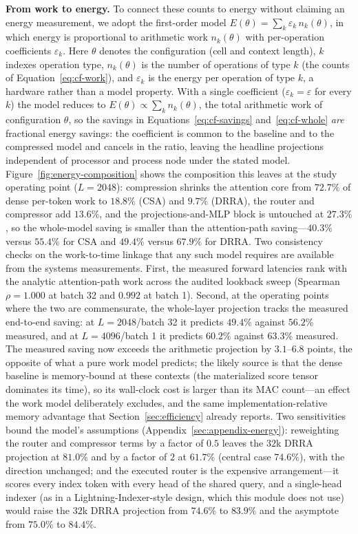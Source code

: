 \textbf{From work to energy.} To connect these counts to energy without
claiming an energy measurement, we adopt the first-order model
$E(\theta) = \sum_k \varepsilon_k \, n_k(\theta)$, in which energy is
proportional to arithmetic work $n_k(\theta)$ with per-operation
coefficients $\varepsilon_k$. Here $\theta$ denotes the configuration
(cell and context length), $k$ indexes operation type, $n_k(\theta)$ is
the number of operations of type $k$ (the counts of
Equation~\ref{eq:cf-work}), and $\varepsilon_k$ is the energy per
operation of type $k$, a hardware rather than a model property. With a
single coefficient ($\varepsilon_k = \varepsilon$ for every $k$) the model
reduces to $E(\theta) \propto \sum_k n_k(\theta)$, the total arithmetic work
of configuration $\theta$, so the savings in
Equations~\ref{eq:cf-savings} and~\ref{eq:cf-whole} \emph{are}
fractional energy savings: the
coefficient is common to the baseline and
to the compressed model and cancels in the ratio, leaving the headline
projections independent of processor and process node under the stated
model. Figure~\ref{fig:energy-composition} shows the composition this
leaves at the study operating point ($L{=}2048$): compression shrinks
the attention core from $72.7\%$ of dense per-token work to $18.8\%$
(CSA) and $9.7\%$ (DRRA), the router and compressor add $13.6\%$, and
the projections-and-MLP block is untouched at $27.3\%$, so the
whole-model saving is smaller than the attention-path
saving---$40.3\%$ versus $55.4\%$ for CSA and $49.4\%$ versus $67.9\%$
for DRRA. Two consistency checks on the
work-to-time linkage that any such model requires are available from the
systems measurements. First, the measured forward latencies rank with the
analytic attention-path work across the audited lookback sweep (Spearman
$\rho = 1.000$ at batch 32 and $0.992$ at batch 1). Second, at the
operating points where the two are commensurate, the whole-layer
projection tracks the measured end-to-end saving: at $L{=}2048$/batch 32
it predicts $49.4\%$ against $56.2\%$ measured, and at $L{=}4096$/batch 1
it predicts $60.2\%$ against $63.3\%$ measured. The measured saving now
exceeds the arithmetic projection by $3.1$--$6.8$ points, the opposite of
what a pure work model predicts; the likely source is that the
dense baseline is memory-bound at these contexts (the materialized score
tensor dominates its time), so its wall-clock cost is larger than its
MAC count---an effect the work model deliberately excludes, and the same
implementation-relative memory advantage that Section~\ref{sec:efficiency}
already reports. Two
sensitivities bound the model's assumptions
(Appendix~\ref{sec:appendix-energy}): reweighting the router and
compressor terms by a factor of $0.5$ leaves the $32$k DRRA projection at
$81.0\%$ and by a factor of $2$ at $61.7\%$ (central case $74.6\%$), with the
direction unchanged; and the executed
router is the expensive arrangement---it scores every index token with
every head of the shared query, and a single-head indexer (as in a
Lightning-Indexer-style design, which this module does not use) would raise the
$32$k DRRA projection from $74.6\%$ to $83.9\%$ and the asymptote from
$75.0\%$ to $84.4\%$.


